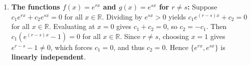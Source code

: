 \begin{exercisesolution*}
\begin{enumerate}[label=\textbf{(\alph*)}]
    \item \textbf{The functions $f(x) = e^{rx}$ and $g(x) = e^{sx}$ for $r \ne s$:}
    Suppose $c_1 e^{rx} + c_2 e^{sx} = 0$ for all $x \in \mathbb{R}$.
    Dividing by $e^{sx} > 0$ yields $c_1 e^{(r-s)x} + c_2 = 0$ for all $x \in \mathbb{R}$.
    Evaluating at $x = 0$ gives $c_1 + c_2 = 0$, so $c_2 = -c_1$.
    Then $c_1 (e^{(r-s)x} - 1) = 0$ for all $x \in \mathbb{R}$.
    Since $r \ne s$, choosing $x = 1$ gives $e^{r-s} - 1 \ne 0$, which forces $c_1 = 0$, and thus $c_2 = 0$.
    Hence $\{e^{rx}, e^{sx}\}$ is \textbf{linearly independent}.
\end{enumerate}
\end{exercisesolution*}

